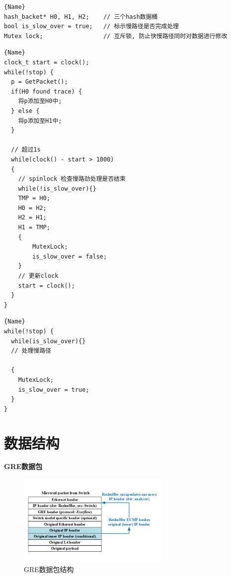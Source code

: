 \begin{lstlisting}[caption=数据结构,frame=tlrb]{Name}
hash_backet* H0, H1, H2;    // 三个hash数据桶
bool is_slow_over = true;   // 标示慢路径是否完成处理
Mutex lock;                 // 互斥锁, 防止快慢路径同时对数据进行修改
\end{lstlisting}

\noindent\begin{minipage}{.55\textwidth}
\begin{lstlisting}[caption=快路径线程,frame=tlrb]{Name}
clock_t start = clock();
while(!stop) {
  p = GetPacket();
  if(H0 found trace) {
    将p添加至H0中;
  } else {
    将p添加至H1中;
  }

  // 超过1s
  while(clock() - start > 1000)
  {
    // spinlock 检查慢路劲处理是否结束
    while(!is_slow_over){}
    TMP = H0;
    H0 = H2;
    H2 = H1;
    H1 = TMP;
    {
        MutexLock;
        is_slow_over = false;
    }
    // 更新clock
    start = clock();
  }
}
\end{lstlisting}
\end{minipage}\hfill
\begin{minipage}{.38\textwidth}
\begin{lstlisting}[caption=慢路径线程,frame=tlrb]{Name}
while(!stop) {
  while(is_slow_over){}
  // 处理慢路径

  {
    MutexLock;
    is_slow_over = true;
  }
}
\end{lstlisting}
\end{minipage}

\section{数据结构}

\textbf{GRE数据包}

\begin{figure}[htbp!]
  \centering
  \includegraphics[width=0.65\textwidth]{../img/format_gre.png}
  \caption{GRE数据包结构}
  \label{fig:gre_packet}
\end{figure}

